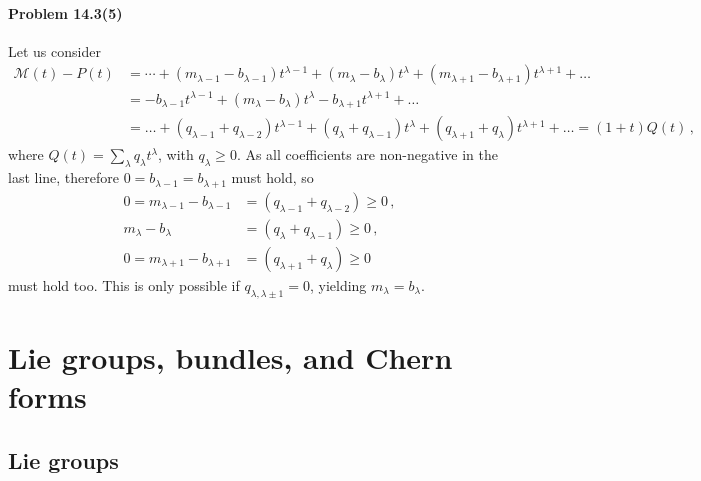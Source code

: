 \documentclass[a4paper,12pt]{article}
\newcommand{\problem}[1]{\paragraph{Problem #1}}
\begin{document}
\problem{14.3(5)} Let us consider
\[\begin{aligned}
 \mathcal{M}(t) - P(t) &= \cdots + (m_{\lambda-1}-b_{\lambda-1})t^{\lambda-1} + (m_{\lambda}-b_\lambda)t^\lambda + (m_{\lambda+1}-b_{\lambda+1})t^{\lambda+1}+\dots\\
 &=-b_{\lambda-1}t^{\lambda-1} + (m_\lambda-b_\lambda)t^\lambda -b_{\lambda+1}t^{\lambda+1}+\dots\\
 &= \dots+(q_{\lambda-1}+q_{\lambda-2})t^{\lambda-1} + (q_\lambda+q_{\lambda-1})t^\lambda + (q_{\lambda+1}+q_\lambda)t^{\lambda+1}+\dots = (1+t)Q(t)\,,
\end{aligned}\]
where $Q(t)=\sum_\lambda q_\lambda t^\lambda$, with $q_\lambda \ge 0$. As all coefficients are non-negative in the last line, therefore $0 = b_{\lambda-1}=b_{\lambda+1}$ must hold, so
\[
 \begin{aligned}
  0 = m_{\lambda-1}-b_{\lambda-1} &= (q_{\lambda-1}+q_{\lambda-2})\ge 0\,,\\
  m_\lambda-b_\lambda &= (q_\lambda+q_{\lambda-1})\ge 0\,,\\
  0 = m_{\lambda+1}-b_{\lambda+1} &= (q_{\lambda+1}+q_{\lambda})\ge 0
 \end{aligned}
\]
must hold too. This is only possible if $q_{\lambda, \lambda\pm 1}=0$, yielding $m_\lambda=b_{\lambda}$.


\section{Lie groups, bundles, and Chern forms}

\subsection{Lie groups}

\end{document}
